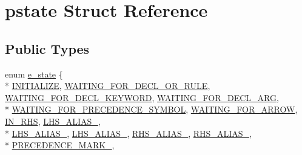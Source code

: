 \hypertarget{structpstate}{\section{pstate Struct Reference}
\label{structpstate}
}
\subsection*{Public Types}
\begin{DoxyCompactItemize}
\item 
enum \hyperlink{structpstate_a55db929db20b5517f8672481cf77d778}{e\-\_\-state} \{ \\*
\hyperlink{structpstate_a55db929db20b5517f8672481cf77d778aed99604f71a2e21485dcd82ca91ced55}{I\-N\-I\-T\-I\-A\-L\-I\-Z\-E}, 
\hyperlink{structpstate_a55db929db20b5517f8672481cf77d778a1ed26bfc2ad8b0e2f95b49fa40755bcf}{W\-A\-I\-T\-I\-N\-G\-\_\-\-F\-O\-R\-\_\-\-D\-E\-C\-L\-\_\-\-O\-R\-\_\-\-R\-U\-L\-E}, 
\hyperlink{structpstate_a55db929db20b5517f8672481cf77d778a1fb957743af45bb30af49e065a6d8108}{W\-A\-I\-T\-I\-N\-G\-\_\-\-F\-O\-R\-\_\-\-D\-E\-C\-L\-\_\-\-K\-E\-Y\-W\-O\-R\-D}, 
\hyperlink{structpstate_a55db929db20b5517f8672481cf77d778a0c58e9f9b24875c70eb9f32234546b28}{W\-A\-I\-T\-I\-N\-G\-\_\-\-F\-O\-R\-\_\-\-D\-E\-C\-L\-\_\-\-A\-R\-G}, 
\\*
\hyperlink{structpstate_a55db929db20b5517f8672481cf77d778ad3eaf4bb72f3fdc8628a0702e7b4ff02}{W\-A\-I\-T\-I\-N\-G\-\_\-\-F\-O\-R\-\_\-\-P\-R\-E\-C\-E\-D\-E\-N\-C\-E\-\_\-\-S\-Y\-M\-B\-O\-L}, 
\hyperlink{structpstate_a55db929db20b5517f8672481cf77d778ad51d0b0ed1ad0aba148e7ddb078248d1}{W\-A\-I\-T\-I\-N\-G\-\_\-\-F\-O\-R\-\_\-\-A\-R\-R\-O\-W}, 
\hyperlink{structpstate_a55db929db20b5517f8672481cf77d778a2ab1dda3fa1f62aada27b8dcec1ace9f}{I\-N\-\_\-\-R\-H\-S}, 
\hyperlink{structpstate_a55db929db20b5517f8672481cf77d778a08ff151c99ef392a18ad8379167e8353}{L\-H\-S\-\_\-\-A\-L\-I\-A\-S\-\_}, 
\\*
\hyperlink{structpstate_a55db929db20b5517f8672481cf77d778a6bc7f7b4b2c30436f761e8788a194402}{L\-H\-S\-\_\-\-A\-L\-I\-A\-S\-\_}, 
\hyperlink{structpstate_a55db929db20b5517f8672481cf77d778a111be997f473438eba11519bc8f5994f}{L\-H\-S\-\_\-\-A\-L\-I\-A\-S\-\_}, 
\hyperlink{structpstate_a55db929db20b5517f8672481cf77d778acceb8cfc079f506bcadc8ddbc7956d8c}{R\-H\-S\-\_\-\-A\-L\-I\-A\-S\-\_}, 
\hyperlink{structpstate_a55db929db20b5517f8672481cf77d778a70aa365c9f0d25e7a64dcec07dc45aec}{R\-H\-S\-\_\-\-A\-L\-I\-A\-S\-\_}, 
\\*
\hyperlink{structpstate_a55db929db20b5517f8672481cf77d778afad73c34d23c498c5f8f6cb132fd0836}{P\-R\-E\-C\-E\-D\-E\-N\-C\-E\-\_\-\-M\-A\-R\-K\-\_}, 

\end{DoxyCompactItemize}
